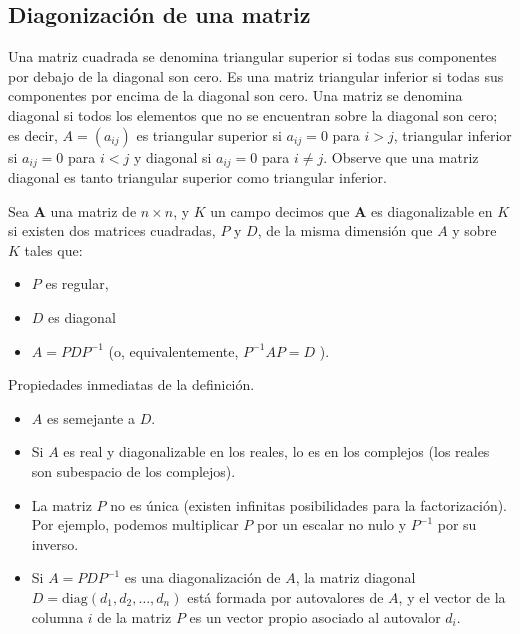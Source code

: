 \subsection{Diagonización de una matriz}
\begin{definition}
Una matriz cuadrada se denomina triangular superior si todas sus componentes por debajo de la diagonal son cero. Es una matriz triangular inferior si todas sus componentes por encima de la diagonal son cero. Una matriz se denomina diagonal si todos los elementos que no se encuentran sobre la diagonal son cero; es decir, \( A = (a_{ij}) \) es triangular superior si \( a_{ij} = 0 \) para \( i > j \), triangular inferior si \( a_{ij} = 0 \) para \( i < j \) y diagonal si \( a_{ij} = 0 \) para \( i \neq j \). Observe que una matriz diagonal es tanto triangular superior como triangular inferior.

\end{definition}
\begin{definition}
Sea $\boldsymbol{A}$ una matriz de ${n \times n}$, y $K$  un campo  decimos que $\boldsymbol{A}$ es diagonalizable en $K$ si existen dos matrices cuadradas, $P$ y $D$, de la misma dimensión que $A$ y sobre $K$ tales que:\\
\begin{itemize}
 \item  $P$ es regular,
 \item  $D$ es diagonal 
 \item  $A=P D P^{-1}$
(o, equivalentemente, $P^{-1} A P=D$ ).
\end{itemize}
\end{definition}
Propiedades inmediatas de la definición.
\begin{itemize}
    \item $A$ es semejante a $D$.
    \item Si $A$ es real y diagonalizable en los reales, lo es en los complejos (los reales son subespacio de los complejos).
    \item La matriz $P$ no es única (existen infinitas posibilidades para la factorización). Por ejemplo, podemos multiplicar $P$ por un escalar no nulo y $P^{-1}$ por su inverso.
    \item Si $A = PDP^{-1}$ es una diagonalización de $A$, la matriz diagonal $D = \text{diag}(d_1, d_2, \dots, d_n)$ está formada por autovalores de $A$, y el vector de la columna $i$ de la matriz $P$ es un vector propio asociado al autovalor $d_i$.
\end{itemize}
